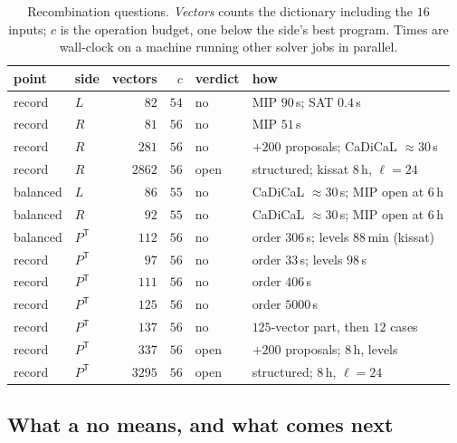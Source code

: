 \documentclass[11pt]{article}
\theoremstyle{remark}
\newcommand{\Pt}{P^{\mathsf T}}
\begin{document}
\begin{table}[ht]
\centering
\caption{Recombination questions.  \emph{Vectors} counts the dictionary
including the $16$ inputs; $c$ is the operation budget, one below the
side's best program.  Times are wall-clock on a machine running other
solver jobs in parallel.}\label{tab:verdicts}
\small
\begin{tabular}{llrrll}
\toprule
point & side & vectors & $c$ & verdict & how \\
\midrule
record & $L$ & $82$ & $54$ & no & MIP $90$\,s; SAT $0.4$\,s \\
record & $R$ & $81$ & $56$ & no & MIP $51$\,s \\
record & $R$ & $281$ & $56$ & no & $+200$ proposals; CaDiCaL ${\approx}30$\,s \\
record & $R$ & $2862$ & $56$ & open & structured; kissat $8$\,h, $\ell=24$ \\
balanced & $L$ & $86$ & $55$ & no & CaDiCaL ${\approx}30$\,s; MIP open at $6$\,h \\
balanced & $R$ & $92$ & $55$ & no & CaDiCaL ${\approx}30$\,s; MIP open at $6$\,h \\
balanced & $\Pt$ & $112$ & $56$ & no & order $306$\,s; levels $88$\,min (kissat) \\
record & $\Pt$ & $97$ & $56$ & no & order $33$\,s; levels $98$\,s \\
record & $\Pt$ & $111$ & $56$ & no & order $406$\,s \\
record & $\Pt$ & $125$ & $56$ & no & order $5000$\,s \\
record & $\Pt$ & $137$ & $56$ & no & $125$-vector part, then $12$ cases \\
record & $\Pt$ & $337$ & $56$ & open & $+200$ proposals; $8$\,h, levels \\
record & $\Pt$ & $3295$ & $56$ & open & structured; $8$\,h, $\ell=24$ \\
\bottomrule
\end{tabular}
\end{table}

\subsection{What a no means, and what comes next}
\end{document}
